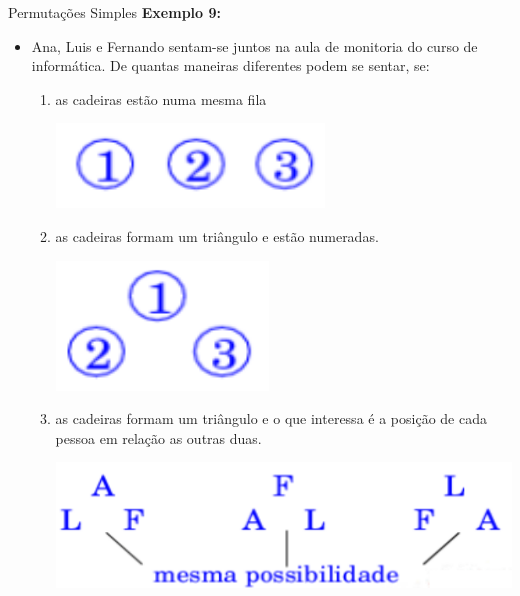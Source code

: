 \documentclass[aspectratio=169]{beamer}
\begin{document}
\begin{frame}{Permutações Simples}
    \textbf{Exemplo 9:}

    \vspace{2mm}

    \begin{itemize}
        \item[] Ana, Luis e Fernando sentam-se juntos na aula de monitoria do curso de informática. De quantas maneiras diferentes podem se sentar, se:
        \begin{enumerate}[(1)]
            \item as cadeiras estão numa mesma fila
            \begin{center}
                \includegraphics[width=0.2\linewidth]{figs/Exemplo9_1.png}
            \end{center}
            \item as cadeiras formam um triângulo e estão numeradas.
            \begin{center}
                \includegraphics[width=0.1\linewidth]{figs/Exemplo9_2.png}
            \end{center}
            \item as cadeiras formam um triângulo e o que interessa é a posição de cada pessoa em relação as outras duas.
            \begin{center}
                \includegraphics[width=0.4\linewidth]{figs/Exemplo9_3.png}
            \end{center}
        \end{enumerate}
    \end{itemize}
\end{frame}
\end{document}
